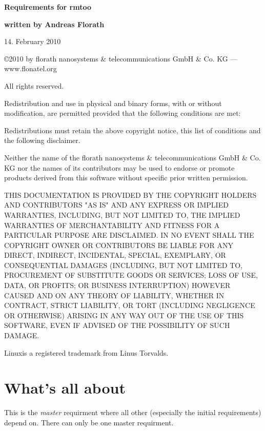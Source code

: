 \documentclass{article}
\begin{document}
\thispagestyle{empty}

\mbox{}

\vfill

{\LARGE\textbf{Requirements for rmtoo}}

\vfill

{\Large\textbf{written by Andreas Florath}}

\vfill

14. February 2010

\vfill

\newpage

\mbox{}

\vfill

{\small

\copyright 2010 by florath nanosystems \& telecommunications GmbH \& Co. KG
--- www.flonatel.org 

All rights reserved.

Redistribution and use in physical and binary forms, with or without
modification, are permitted provided that the following conditions are
met:

Redistributions must retain the above copyright notice, this list of
conditions and the following disclaimer.

Neither the name of the florath nanosystems \& telecommunications GmbH
\& Co. KG nor the names of its contributors may be used to endorse or
promote products derived from this software without specific prior
written permission.

THIS DOCUMENTATION IS PROVIDED BY THE COPYRIGHT HOLDERS AND
CONTRIBUTORS "AS IS" AND ANY EXPRESS OR IMPLIED WARRANTIES, INCLUDING,
BUT NOT LIMITED TO, THE IMPLIED WARRANTIES OF MERCHANTABILITY AND
FITNESS FOR A PARTICULAR PURPOSE ARE DISCLAIMED. IN NO EVENT SHALL THE
COPYRIGHT OWNER OR CONTRIBUTORS BE LIABLE FOR ANY DIRECT, INDIRECT,
INCIDENTAL, SPECIAL, EXEMPLARY, OR CONSEQUENTIAL DAMAGES (INCLUDING,
BUT NOT LIMITED TO, PROCUREMENT OF SUBSTITUTE GOODS OR SERVICES; LOSS
OF USE, DATA, OR PROFITS; OR BUSINESS INTERRUPTION) HOWEVER CAUSED AND
ON ANY THEORY OF LIABILITY, WHETHER IN CONTRACT, STRICT LIABILITY, OR
TORT (INCLUDING NEGLIGENCE OR OTHERWISE) ARISING IN ANY WAY OUT OF THE
USE OF THIS SOFTWARE, EVEN IF ADVISED OF THE POSSIBILITY OF SUCH
DAMAGE.

Linux\textregistered is a registered trademark from Linus Torvalds.
}
\newpage

\tableofcontents

\newpage

\section{What's all about}
This is the \textsl{master} requirment where all other (especially the
initial requirements) depend on. There can only be one master requirment.

\end{document}
